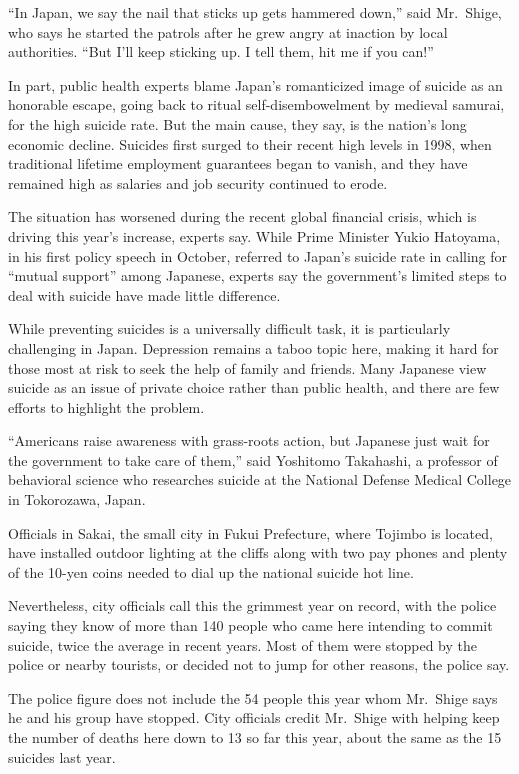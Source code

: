 ﻿\documentclass[12pt]{article}
\begin{document}
``In Japan, we say the nail that sticks up gets hammered down,'' said Mr.~Shige, who says he started
the patrols after he grew angry at inaction by local authorities. ``But I'll keep sticking up. I
tell them, hit me if you can!''

In part, public health experts blame Japan's romanticized image of suicide as an honorable escape,
going back to ritual self-disembowelment by medieval samurai, for the high suicide rate. But the
main cause, they say, is the nation's long economic decline. Suicides first surged to their recent
high levels in 1998, when traditional lifetime employment guarantees began to vanish, and they have
remained high as salaries and job security continued to erode.

The situation has worsened during the recent global financial crisis, which is driving this year's
increase, experts say. While Prime Minister Yukio Hatoyama, in his first policy speech in October,
referred to Japan's suicide rate in calling for ``mutual support'' among Japanese, experts say the
government's limited steps to deal with suicide have made little difference.

While preventing suicides is a universally difficult task, it is particularly challenging in Japan.
Depression remains a taboo topic here, making it hard for those most at risk to seek the help of
family and friends. Many Japanese view suicide as an issue of private choice rather than public
health, and there are few efforts to highlight the problem.

``Americans raise awareness with grass-roots action, but Japanese just wait for the government to
take care of them,'' said Yoshitomo Takahashi, a professor of behavioral science who researches
suicide at the National Defense Medical College in Tokorozawa, Japan.

Officials in Sakai, the small city in Fukui Prefecture, where Tojimbo is located, have installed
outdoor lighting at the cliffs along with two pay phones and plenty of the 10-yen coins needed to
dial up the national suicide hot line.

Nevertheless, city officials call this the grimmest year on record, with the police saying they know
of more than 140 people who came here intending to commit suicide, twice the average in recent
years. Most of them were stopped by the police or nearby tourists, or decided not to jump for other
reasons, the police say.

The police figure does not include the 54 people this year whom Mr.~Shige says he and his group have
stopped. City officials credit Mr.~Shige with helping keep the number of deaths here down to 13 so
far this year, about the same as the 15 suicides last year.
\end{document}
